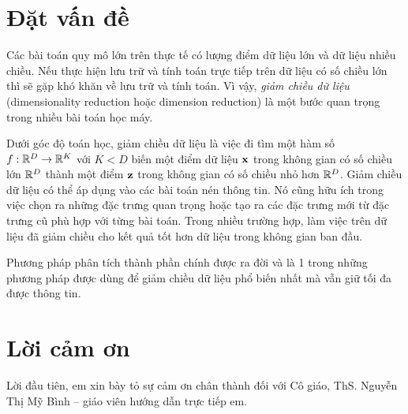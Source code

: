 

\section{Đặt vấn đề}

Các bài toán quy mô lớn trên thực tế có lượng điểm dữ liệu lớn và dữ liệu nhiều
chiều. Nếu thực hiện lưu trữ và tính toán trực tiếp trên dữ liệu có số chiều lớn
thì sẽ gặp khó khăn về lưu trữ và tính toán. Vì vậy, \textit{giảm
    chiều dữ liệu} ({dimensionality reduction} hoặc {dimension reduction}) là một
bước quan trọng trong nhiều bài toán học máy.


Dưới góc độ toán học, giảm chiều dữ liệu là việc đi tìm một hàm số $f: \mathbb{R}^D
    \rightarrow \mathbb{R}^K$ với $K < D$ biến một điểm dữ liệu $\mathbf{x}$ trong không gian có số
chiều lớn $\mathbb{R}^D$ thành một điểm $\mathbf{z}$ trong không gian có số chiều nhỏ hơn
$\mathbb{R}^D$. Giảm chiều dữ liệu có thể áp dụng vào các bài toán nén thông tin. Nó cũng hữu ích trong việc chọn ra những đặc trưng quan trọng hoặc
tạo ra các đặc trưng mới từ đặc trưng cũ phù hợp với từng bài toán. Trong nhiều trường hợp, làm việc trên dữ liệu đã giảm chiều cho kết quả tốt
hơn dữ liệu trong không gian ban đầu.

Phương pháp phân tích thành phần chính được ra đời và là 1 trong những phương pháp được dùng để giảm chiều dữ liệu phổ biến nhất
mà vẫn giữ tối đa được thông tin.


\newpage 
\section{Lời cảm ơn}

Lời đầu tiên, em xin bày tỏ sự cảm ơn chân thành đối với Cô giáo, ThS.
Nguyễn Thị Mỹ Bình – giáo viên hướng dẫn trực tiếp em.

